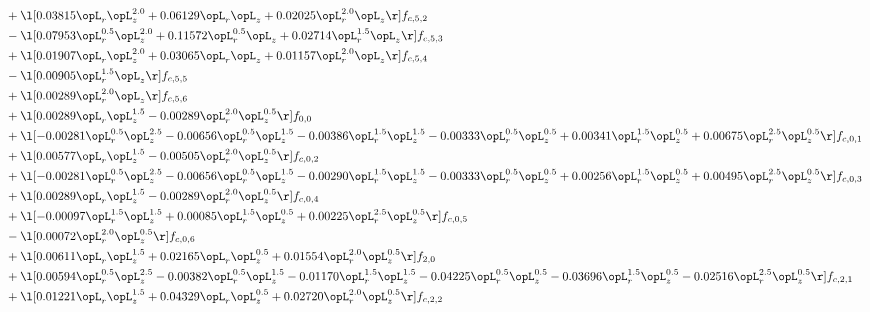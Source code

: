 \begin{alignat}{2}
& + \l[  0.03815 \opL_r \opL_z^{2.0} +  0.06129 \opL_r \opL_z +  0.02025 \opL_r^{2.0} \opL_z  \r] f_{c,5,2} \nonumber \\ 
& - \l[  0.07953 \opL_r^{0.5} \opL_z^{2.0} +  0.11572 \opL_r^{0.5} \opL_z +  0.02714 \opL_r^{1.5} \opL_z  \r] f_{c,5,3} \nonumber \\ 
& + \l[  0.01907 \opL_r \opL_z^{2.0} +  0.03065 \opL_r \opL_z +  0.01157 \opL_r^{2.0} \opL_z  \r] f_{c,5,4} \nonumber \\ 
& - \l[  0.00905 \opL_r^{1.5} \opL_z  \r] f_{c,5,5} \nonumber \\ 
& + \l[  0.00289 \opL_r^{2.0} \opL_z  \r] f_{c,5,6} \nonumber \\ 
& + \l[  0.00289 \opL_r \opL_z^{1.5}   -0.00289 \opL_r^{2.0} \opL_z^{0.5}  \r] f_{0,0} \nonumber \\ 
& + \l[  -0.00281 \opL_r^{0.5} \opL_z^{2.5}   -0.00656 \opL_r^{0.5} \opL_z^{1.5}   -0.00386 \opL_r^{1.5} \opL_z^{1.5}   -0.00333 \opL_r^{0.5} \opL_z^{0.5} +  0.00341 \opL_r^{1.5} \opL_z^{0.5} +  0.00675 \opL_r^{2.5} \opL_z^{0.5}  \r] f_{c,0,1} \nonumber \\ 
& + \l[  0.00577 \opL_r \opL_z^{1.5}   -0.00505 \opL_r^{2.0} \opL_z^{0.5}  \r] f_{c,0,2} \nonumber \\ 
& + \l[  -0.00281 \opL_r^{0.5} \opL_z^{2.5}   -0.00656 \opL_r^{0.5} \opL_z^{1.5}   -0.00290 \opL_r^{1.5} \opL_z^{1.5}   -0.00333 \opL_r^{0.5} \opL_z^{0.5} +  0.00256 \opL_r^{1.5} \opL_z^{0.5} +  0.00495 \opL_r^{2.5} \opL_z^{0.5}  \r] f_{c,0,3} \nonumber \\ 
& + \l[  0.00289 \opL_r \opL_z^{1.5}   -0.00289 \opL_r^{2.0} \opL_z^{0.5}  \r] f_{c,0,4} \nonumber \\ 
& + \l[  -0.00097 \opL_r^{1.5} \opL_z^{1.5} +  0.00085 \opL_r^{1.5} \opL_z^{0.5} +  0.00225 \opL_r^{2.5} \opL_z^{0.5}  \r] f_{c,0,5} \nonumber \\ 
& - \l[  0.00072 \opL_r^{2.0} \opL_z^{0.5}  \r] f_{c,0,6} \nonumber \\ 
& + \l[  0.00611 \opL_r \opL_z^{1.5} +  0.02165 \opL_r \opL_z^{0.5} +  0.01554 \opL_r^{2.0} \opL_z^{0.5}  \r] f_{2,0} \nonumber \\ 
& + \l[  0.00594 \opL_r^{0.5} \opL_z^{2.5}   -0.00382 \opL_r^{0.5} \opL_z^{1.5}   -0.01170 \opL_r^{1.5} \opL_z^{1.5}   -0.04225 \opL_r^{0.5} \opL_z^{0.5}   -0.03696 \opL_r^{1.5} \opL_z^{0.5}   -0.02516 \opL_r^{2.5} \opL_z^{0.5}  \r] f_{c,2,1} \nonumber \\ 
& + \l[  0.01221 \opL_r \opL_z^{1.5} +  0.04329 \opL_r \opL_z^{0.5} +  0.02720 \opL_r^{2.0} \opL_z^{0.5}  \r] f_{c,2,2} \nonumber \\ 

\end{alignat}
